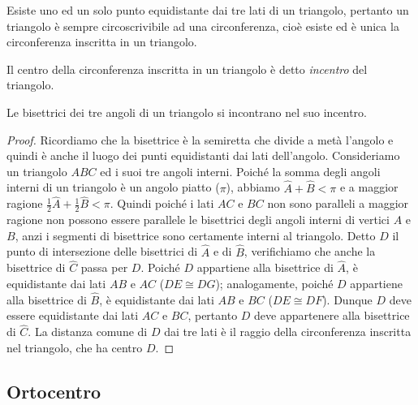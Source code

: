 Esiste uno ed un solo punto equidistante dai tre lati di un 
triangolo, pertanto un triangolo è sempre circoscrivibile ad una 
circonferenza, cioè esiste ed è unica la circonferenza inscritta in un 
triangolo.

\begin{definizione}
Il centro della circonferenza inscritta in un triangolo è detto 
\emph{incentro} del triangolo.
\end{definizione}

\begin{teorema}
Le bisettrici dei tre angoli di un triangolo si incontrano nel suo 
incentro.
\end{teorema}


\begin{inaccessibleblock}
 \begin{figure}[htb]
	\centering
\end{figure}
\end{inaccessibleblock}
\begin{proof}
Ricordiamo che la bisettrice è la semiretta che divide a metà 
l'angolo e quindi è anche il luogo dei punti equidistanti dai lati 
dell'angolo. Consideriamo un triangolo \(ABC\) ed i suoi tre angoli 
interni. Poiché la somma degli angoli interni di un triangolo è un 
angolo piatto (\(\pi\)), abbiamo \(\widehat{A}+\widehat{B}<\pi\) e a 
maggior ragione \(\frac{1}{2}\widehat{A}+\frac{1}{2}\widehat{B}<\pi\). 
Quindi poiché i lati \(AC\) e \(BC\) non sono paralleli a maggior ragione 
non possono essere parallele le bisettrici degli angoli interni di 
vertici \(A\) e \(B\), anzi i segmenti di bisettrice sono certamente 
interni al triangolo. Detto \(D\) il punto di intersezione delle 
bisettrici di \(\widehat{A}\) e di \(\widehat{B}\), verifichiamo che anche 
la bisettrice di \(\widehat{C}\) passa per \(D\). Poiché \(D\) appartiene 
alla bisettrice di \(\widehat{A}\), è equidistante dai lati \(AB\) e \(AC\) 
(\(DE\cong DG\)); analogamente, poiché \(D\) appartiene alla bisettrice di 
\(\widehat{B}\), è equidistante dai lati \(AB\) e \(BC\) (\(DE\cong DF\)). 
Dunque \(D\) deve essere equidistante dai lati \(AC\) e \(BC\), pertanto \(D\) 
deve appartenere alla bisettrice di \(\widehat{C}\). La distanza comune 
di \(D\) dai tre lati è il raggio della circonferenza inscritta nel 
triangolo, che ha centro \(D\).
\end{proof}

\subsection{Ortocentro}

